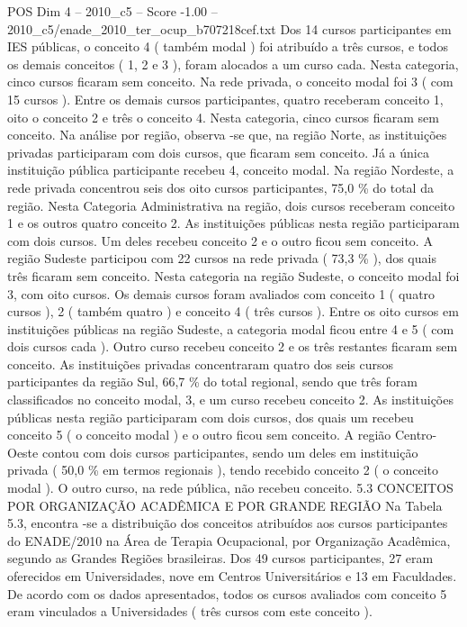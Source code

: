 \begin{textsample}{POS Dim 4 – 2010\_c5 – Score -1.00 – 2010\_c5/enade\_2010\_ter\_ocup\_b707218cef.txt}
Dos 14 cursos participantes em IES públicas, o conceito 4 ( também modal ) foi atribuído a três cursos, e todos os demais conceitos ( 1, 2 e 3 ), foram alocados a um curso cada.
Nesta categoria, cinco cursos ficaram sem conceito.
Na rede privada, o conceito modal foi 3 ( com 15 cursos ).
Entre os demais cursos participantes, quatro receberam conceito 1, oito o conceito 2 e três o conceito 4.
Nesta categoria, cinco cursos ficaram sem conceito.
Na análise por região, observa -se que, na região Norte, as instituições privadas participaram com dois cursos, que ficaram sem conceito.
Já a única instituição pública participante recebeu 4, conceito modal.
Na região Nordeste, a rede privada concentrou seis dos oito cursos participantes, 75,0 \% do total da região.
Nesta Categoria Administrativa na região, dois cursos receberam conceito 1 e os outros quatro conceito 2.
As instituições públicas nesta região participaram com dois cursos.
Um deles recebeu conceito 2 e o outro ficou sem conceito.
A região Sudeste participou com 22 cursos na rede privada ( 73,3 \% ), dos quais três ficaram sem conceito.
Nesta categoria na região Sudeste, o conceito modal foi 3, com oito cursos.
Os demais cursos foram avaliados com conceito 1 ( quatro cursos ), 2 ( também quatro ) e conceito 4 ( três cursos ).
Entre os oito cursos em instituições públicas na região Sudeste, a categoria modal ficou entre 4 e 5 ( com dois cursos cada ).
Outro curso recebeu conceito 2 e os três restantes ficaram sem conceito.
As instituições privadas concentraram quatro dos seis cursos participantes da região Sul, 66,7 \% do total regional, sendo que três foram classificados no conceito modal, 3, e um curso recebeu conceito 2.
As instituições públicas nesta região participaram com dois cursos, dos quais um recebeu conceito 5 ( o conceito modal ) e o outro ficou sem conceito.
A região Centro-Oeste contou com dois cursos participantes, sendo um deles em instituição privada ( 50,0 \% em termos regionais ), tendo recebido conceito 2 ( o conceito modal ).
O outro curso, na rede pública, não recebeu conceito. 5.3 CONCEITOS POR ORGANIZAÇÃO ACADÊMICA E POR GRANDE REGIÃO Na Tabela 5.3, encontra -se a distribuição dos conceitos atribuídos aos cursos participantes do ENADE/2010 na Área de Terapia Ocupacional, por Organização Acadêmica, segundo as Grandes Regiões brasileiras.
Dos 49 cursos participantes, 27 eram oferecidos em Universidades, nove em Centros Universitários e 13 em Faculdades.
De acordo com os dados apresentados, todos os cursos avaliados com conceito 5 eram vinculados a Universidades ( três cursos com este conceito ).

\end{textsample}
